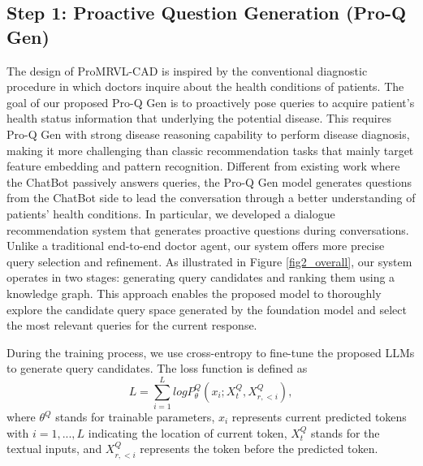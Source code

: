 \subsection{Step 1: Proactive Question Generation (Pro-Q Gen)}
\label{step1}
The design of ProMRVL-CAD is inspired by the conventional diagnostic procedure in which doctors inquire about the health conditions of patients. %
The goal of our proposed Pro-Q Gen is to proactively pose queries to acquire patient's health status information that underlying the potential disease. This requires Pro-Q Gen with strong disease reasoning capability to perform disease diagnosis, making it more challenging than classic recommendation tasks that mainly target feature embedding and pattern recognition. Different from existing work where the ChatBot passively answers queries, the Pro-Q Gen model generates questions from the ChatBot side to lead the conversation through a better understanding of patients' health conditions. In particular, we developed a dialogue recommendation system that generates proactive questions during conversations. Unlike a traditional end-to-end doctor agent, our system offers more precise query selection and refinement. As illustrated in Figure \ref{fig2_overall}, our system operates in two stages: generating query candidates and ranking them using a knowledge graph. This approach enables the proposed model to thoroughly explore the candidate query space generated by the foundation model and select the most relevant queries for the current response.

During the training process, we use cross-entropy to fine-tune the proposed LLMs to generate query candidates. The loss function is defined as 
\begin{equation}
L = \sum^L_{i=1} logP_\theta^{Q}(x_i; X_t^{Q}, X_{r,<i}^{Q}),   
\end{equation}
where $\theta^{Q}$ stands for trainable parameters, $x_i$ represents current predicted tokens with $i = 1, ..., L$ indicating the location of current token, $X_t^{Q}$ stands for the textual inputs, and $X_{r,<i}^{Q}$ represents the token before the predicted token.




